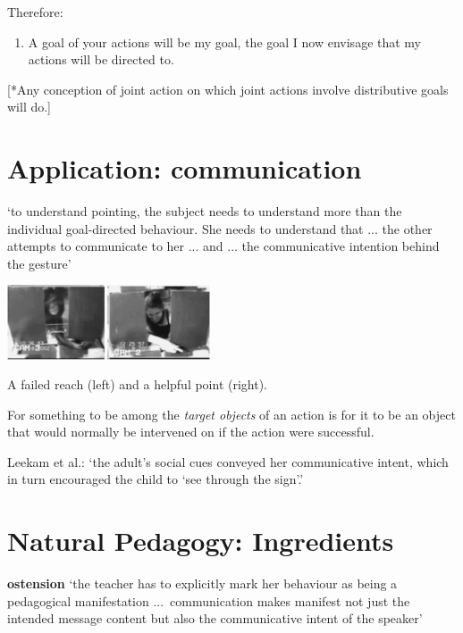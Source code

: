 \documentclass[11pt]{extarticle}
\begin{document}
\begin{multicols}{3}
\begin{enumerate}
\end{enumerate}
%
Therefore:
%
\begin{enumerate}[resume]
%
\item A goal of your actions will be my goal, the goal I now envisage that my actions will be directed to.
\end{enumerate}
%

[*Any conception of joint action on which joint actions involve distributive goals will do.]


\section{Application: communication}

`to understand pointing, the subject needs to understand more than the individual goal-directed behaviour. She needs to understand that ... the other attempts to communicate to her ...  and ... the communicative intention behind the gesture'\citep{Moll:2007gu}


\begin{center}
\includegraphics[width=6cm]{figure_hare_toma_2004_e3.png}
\label{fig:reach_point}

A failed reach (left) and a helpful point (right).\citep%
	{hare_chimpanzees_2004}
\end{center}


For something to be among the \emph{target objects} of an action is for it to be an object that would normally be intervened on if the action were successful.


Leekam et al.: `the adult’s social cues conveyed her communicative intent, which in turn encouraged the child to `see through the sign'.'
\citep%
{leekam_adults_2010}


\section{Natural Pedagogy: Ingredients}
\textbf{ostension} `the teacher has to explicitly mark her behaviour as being a pedagogical manifestation ...\  communication makes manifest not just the intended message content but also the communicative intent of the speaker’ \citep{Csibra:2005zr} %


\end{multicols}
\end{document}
